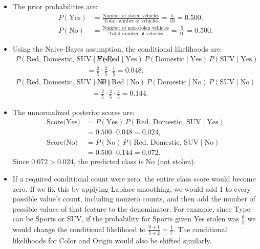 \documentclass[12pt]{article}
\begin{document}
\begin{enumerate}
\begin{itemize}
    \item The prior probabilities are:
    \[
    \begin{aligned}
        P(\text{Yes}) &= \frac{\text{Number of stolen vehicles}}{\text{Total number of vehicles}} = \frac{5}{10} = 0.500, \\
        P(\text{No}) &= \frac{\text{Number of non-stolen vehicles}}{\text{Total number of vehicles}} = \frac{5}{10} = 0.500.
    \end{aligned}
    \]
    \item Using the Naive-Bayes assumption, the conditional likelihoods are:
    \[
    \begin{aligned}
        P(\text{Red, Domestic, SUV} \mid \text{Yes})
        &= P(\text{Red} \mid \text{Yes})\,P(\text{Domestic} \mid \text{Yes})\,P(\text{SUV} \mid \text{Yes}) \\
        &= \frac{3}{5}\cdot\frac{2}{5}\cdot\frac{1}{5} = 0.048.
    \end{aligned}
    \]
    \[
    \begin{aligned}
        P(\text{Red, Domestic, SUV} \mid \text{No})
        &= P(\text{Red} \mid \text{No})\,P(\text{Domestic} \mid \text{No})\,P(\text{SUV} \mid \text{No}) \\
        &= \frac{2}{5}\cdot\frac{3}{5}\cdot\frac{3}{5} = 0.144.
    \end{aligned}
    \]
    \item The unnormalized posterior scores are:
    \[
    \begin{aligned}
        \text{Score(Yes)} &= P(\text{Yes})\,P(\text{Red, Domestic, SUV} \mid \text{Yes}) \\
        &= 0.500\cdot 0.048 = 0.024, \\
        \text{Score(No)} &= P(\text{No})\,P(\text{Red, Domestic, SUV} \mid \text{No}) \\
        &= 0.500\cdot 0.144 = 0.072.
    \end{aligned}
    \]
    Since $0.072 > 0.024$, the predicted class is No (not stolen).
    \item If a required conditional count were zero, the entire class score would become zero. If we fix this by applying Laplace smoothing, we would add 1 to every possible value's count, including nonzero counts, and then add the number of possible values of that feature to the denominator. 
    For example, since Type can be Sports or SUV, if the probability for Sports given Yes stolen was $\frac{0}{5}$ we would change the conditional likelihood to $\frac{0+1}{5+2}=\frac{1}{7}$. The conditional likelihoods for Color and Origin would also be shifted similarly.
\end{itemize}


\end{enumerate}
\end{document}
